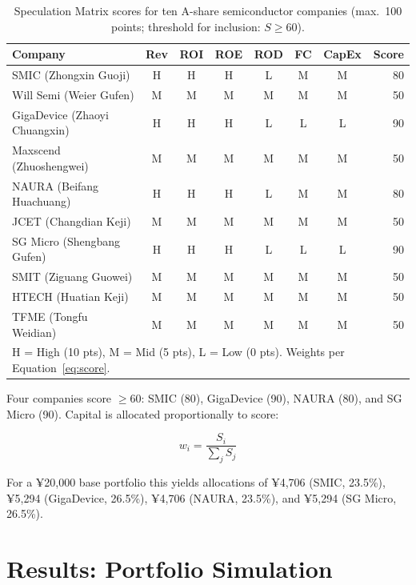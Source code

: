 \documentclass[11pt,a4paper]{article}
\begin{document}
\begin{table}[htbp]
  \centering
  \caption{Speculation Matrix scores for ten A-share semiconductor
           companies (max.\ 100 points; threshold for inclusion:
           $S \geq 60$).}
  \label{tab:scores}
  \begin{tabular}{lccccccr}
    \toprule
    \textbf{Company} & \textbf{Rev} & \textbf{ROI} & \textbf{ROE}
      & \textbf{ROD} & \textbf{FC} & \textbf{CapEx} & \textbf{Score} \\
    \midrule
    SMIC (Zhongxin Guoji)        & H & H & H & L & M & M & 80 \\
    Will Semi (Weier Gufen)   & M & M & M & M & M & M & 50 \\
    GigaDevice (Zhaoyi Chuangxin)  & H & H & H & L & L & L & 90 \\
    Maxscend (Zhuoshengwei)      & M & M & M & M & M & M & 50 \\
    NAURA (Beifang Huachuang)       & H & H & H & L & M & M & 80 \\
    JCET (Changdian Keji)        & M & M & M & M & M & M & 50 \\
    SG Micro (Shengbang Gufen)    & H & H & H & L & L & L & 90 \\
    SMIT (Ziguang Guowei)        & M & M & M & M & M & M & 50 \\
    HTECH (Huatian Keji)       & M & M & M & M & M & M & 50 \\
    TFME (Tongfu Weidian)        & M & M & M & M & M & M & 50 \\
    \bottomrule
    \multicolumn{8}{l}{\small H = High (10 pts), M = Mid (5 pts),
      L = Low (0 pts). Weights per Equation~\eqref{eq:score}.}
  \end{tabular}
\end{table}

Four companies score $\geq 60$: SMIC (80), GigaDevice (90), NAURA (80),
and SG Micro (90). Capital is allocated proportionally to score:

\begin{equation*}
  w_i = \frac{S_i}{\sum_j S_j}
\end{equation*}

For a ¥20,000 base portfolio this yields allocations of ¥4,706 (SMIC,
23.5\%), ¥5,294 (GigaDevice, 26.5\%), ¥4,706 (NAURA, 23.5\%), and
¥5,294 (SG Micro, 26.5\%).

\section{Results: Portfolio Simulation}
\label{sec:results}
\end{document}
